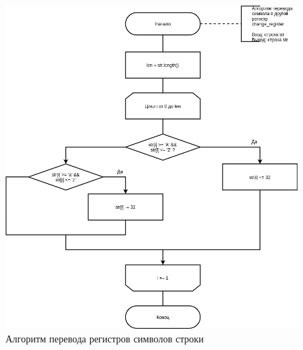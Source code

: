 \begin{figure}[H]
	\begin{center}
		\includegraphics[scale=0.6]{img/register.png}
	\end{center}
	\captionsetup{justification=centering}
	\caption{Алгоритм перевода регистров символов строки}
	\label{img:register}
\end{figure}

